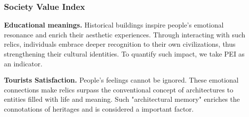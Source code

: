 \documentclass[12pt]{article}
\begin{document}
\subsubsection{Society Value Index}
	\textbf{Educational meanings.} Historical buildings inspire people's emotional resonance and enrich their aesthetic experiences. Through interacting with such relics, individuals embrace deeper recognition to their own civilizations, thus strengthening their cultural identities. To quantify such impact, we take PEI as an indicator.
	
	\textbf{Tourists Satisfaction.} People's feelings cannot be ignored. These emotional connections make relics surpass the conventional concept of architectures to entities filled with life and meaning. Such "architectural memory" enriches the connotations of heritages and is considered a important factor.
\end{document}
